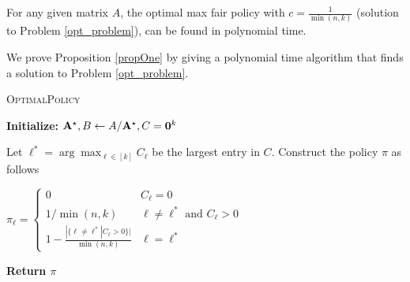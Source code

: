 \begin{proposition}
For any given matrix $A$, the optimal max fair policy with $c = \frac{1}{\min(n,k)}$  (solution to Problem \ref{opt_problem}),  can be found in polynomial time. 
\label{propOne}
\end{proposition}
We prove Proposition \ref{propOne} by giving a polynomial time  algorithm that finds a solution to Problem \ref{opt_problem}. 

\begin{algorithm}[H]
\SetAlgoLined

\caption{\textsc{OptimalPolicy}}
\label{algOne}
{\bf Initialize:} $ \mathbf{A}^{\star}  , B \leftarrow A/\mathbf{A}^{\star} , C = \mathbf{0}^k   $\;

Let $\ell^* = \arg \max_{\ell \in [k]} C_\ell$ be the largest entry in $C$. \;
Construct the policy $\pi$ as follows 
\begin{center}  
$\pi_\ell =
\begin{cases}
 0 &       C_\ell = 0 \\ 
 1/\min(n,k)  &   \ell \neq \ell^*  \text{ and }  C_\ell > 0  \\  
 1 - \frac{|\{\ell\neq \ell^* | C_\ell > 0 \}|}{\min(n,k)}  & \ell = \ell^*
\end{cases}$  \end{center}
 \textbf{Return {$\pi$}}

 \end{algorithm}
 
